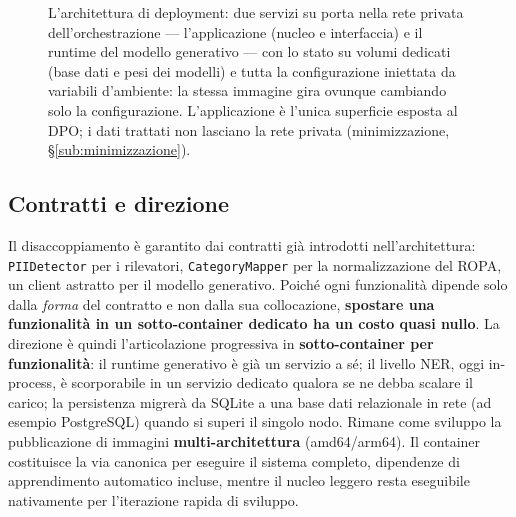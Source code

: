 \begin{figure}[htbp]
\begin{tikzpicture}
	\end{tikzpicture}
	\caption[Deployment containerizzato: servizi, volumi e configurazione]{L'architettura di deployment: due servizi su porta nella rete privata dell'orchestrazione --- l'applicazione (nucleo e interfaccia) e il runtime del modello generativo --- con lo stato su volumi dedicati (base dati e pesi dei modelli) e tutta la configurazione iniettata da variabili d'ambiente: la stessa immagine gira ovunque cambiando solo la configurazione. L'applicazione è l'unica superficie esposta al DPO; i dati trattati non lasciano la rete privata (minimizzazione, §\ref{sub:minimizzazione}).}
	\label{fig:impl-deployment}
\end{figure}

\subsection{Contratti e direzione}
\label{sub:container-direzione}

Il disaccoppiamento è garantito dai contratti già introdotti nell'architettura: \texttt{PIIDetector} per i rilevatori, \texttt{CategoryMapper} per la normalizzazione del ROPA, un client astratto per il modello generativo. Poiché ogni funzionalità dipende solo dalla \textit{forma} del contratto e non dalla sua collocazione, \textbf{spostare una funzionalità in un sotto-container dedicato ha un costo quasi nullo}. La direzione è quindi l'articolazione progressiva in \textbf{sotto-container per funzionalità}: il runtime generativo è già un servizio a sé; il livello NER, oggi in-process, è scorporabile in un servizio dedicato qualora se ne debba scalare il carico; la persistenza migrerà da SQLite a una base dati relazionale in rete (ad esempio PostgreSQL) quando si superi il singolo nodo. Rimane come sviluppo la pubblicazione di immagini \textbf{multi-architettura} (amd64/arm64). Il container costituisce la via canonica per eseguire il sistema completo, dipendenze di apprendimento automatico incluse, mentre il nucleo leggero resta eseguibile nativamente per l'iterazione rapida di sviluppo.